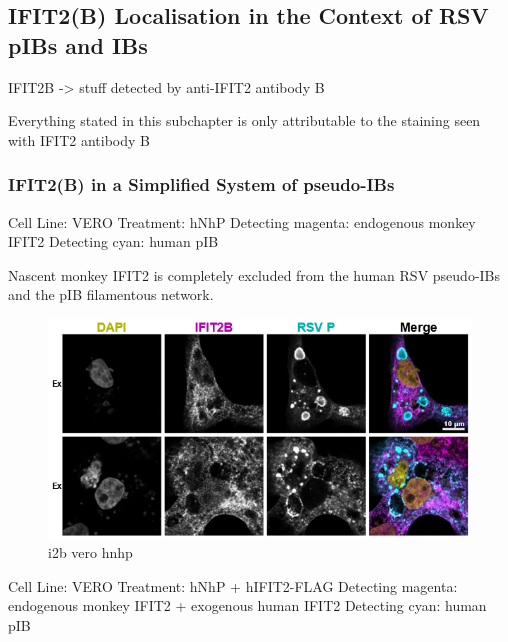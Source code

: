 \subsection{IFIT2(B) Localisation in the Context of RSV pIBs and IBs} \label{subsec:IFIT2(B) Localisation in the Context of RSV pIBs and IBs}
IFIT2B -> stuff detected by anti-IFIT2 antibody B

Everything stated in this subchapter is only attributable to the staining seen with IFIT2 antibody B
\subsubsection{IFIT2(B) in a Simplified System of pseudo-IBs} \label{IFIT2(B) in a Simplified System of pseudo-IBs}
Cell Line: VERO \newline
Treatment: hNhP \newline
Detecting magenta: endogenous monkey IFIT2 \newline
Detecting cyan: human pIB \newline

Nascent monkey IFIT2 is completely excluded from the human RSV pseudo-IBs and the pIB filamentous network.

\begin{figure}
    \centering
    \includegraphics[width=1\linewidth]{10. Chapter 5//Figs//02. I2B/01. i2b vero hnhp.png}
    \caption[i2b vero hnhp]{i2b vero hnhp}
    \label{fig:i2b vero hnhp}
\end{figure}

Cell Line: VERO \newline
Treatment: hNhP + hIFIT2-FLAG \newline
Detecting magenta: endogenous monkey IFIT2 + exogenous human IFIT2 \newline
Detecting cyan: human pIB \newline

